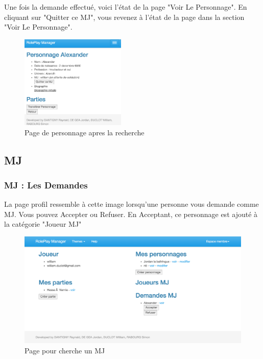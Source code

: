 \documentclass[a4paper,oneside,10pt]{article}
\begin{document}
Une fois la demande effectué, voici l'état de la page "Voir Le Personnage". En cliquant sur "Quitter ce MJ", vous revenez à l'état de la page dans la section "Voir Le Personnage". 

\begin{figure}[H]
	\begin{center}
		\includegraphics[width=5cm]{images/manuel/voirpersonnagedemandeMJ.png}  
		\caption{Page de personnage apres la recherche}
	\end{center}
\end{figure}


\subsection{MJ}

\subsubsection{MJ : Les Demandes}
\label{MUMJLesDemandes}

La page profil ressemble à cette image lorsqu'une personne vous demande comme MJ. Vous pouvez Accepter ou Refuser. En Acceptant, ce personnage est ajouté à la catégorie "Joueur MJ"
\begin{figure}[H]
	\begin{center}
		\includegraphics[width=\textwidth]{images/manuel/profildemande.png}  
		\caption{Page pour cherche un MJ}
	\end{center}
\end{figure}
\end{document}
